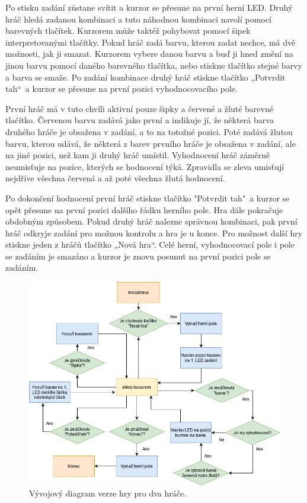 Po stisku zadání zůstane svítit a kurzor se přesune na první herní LED. Druhý hráč hledá zadanou kombinaci a tuto náhodnou kombinaci 
navolí pomocí barevných tlačítek. Kurzorem může taktéž pohybovat pomocí šipek interpretovanými tlačítky.
Pokud hráč zadá barvu, kterou zadat nechce, má dvě možnosti,
jak ji smazat. Kurzorem vybere danou barvu a buď ji hned změní na jinou barvu pomocí daného barevného tlačítka, nebo stiskne tlačítko 
stejné barvy a barva se smaže. Po zadání kombinace 
druhý hráč stiskne tlačítko „Potvrdit tah“\  a kurzor se přesune na první pozici vyhodnocovacího pole. 

První hráč má v tuto chvíli aktivní pouze šipky a červené a žluté barevné tlačítko. Červenou barvu zadává jako první a 
indikuje jí, že některá barva druhého hráče je obsažena v zadání, a to na totožné pozici. Poté zadává žlutou barvu, kterou 
udává, že některá z barev prvního hráče je obsažena v zadání, ale na jiné pozici, než kam ji druhý hráč umístil. Vyhodnocení 
hráč záměrně neumisťuje na pozice, kterých se hodnocení týká. Zpravidla se zleva umisťují nejdříve všechna červená a až poté 
všechna žlutá hodnocení. 

Po dokončení hodnocení první hráč stiskne tlačítko "Potvrdit tah"\  a kurzor se opět přesune na první pozici dalšího řádku herního pole. 
Hra dále pokračuje obdobným způsobem.
Pokud druhý hráč nalezne správnou kombinaci, pak první hráč odkryje zadání pro možnou kontrolu a hra je u konce. Pro možnost další 
hry stiskne jeden z hráčů tlačítko „Nová hra“. Celé herní, vyhodnocovací pole i pole se zadáním je smazáno a kurzor je znovu posunut 
na první pozici pole se zadáním. 

\begin{figure}[!h]
    \begin{center}
        \includegraphics[scale=0.6]{obrazky/vyvojovy_diagram_2_hraci.png}
    \end{center}
    \caption[Vývojový diagram verze hry pro dva hráče]{Vývojový diagram verze hry pro dva hráče.}
    \end{figure}

